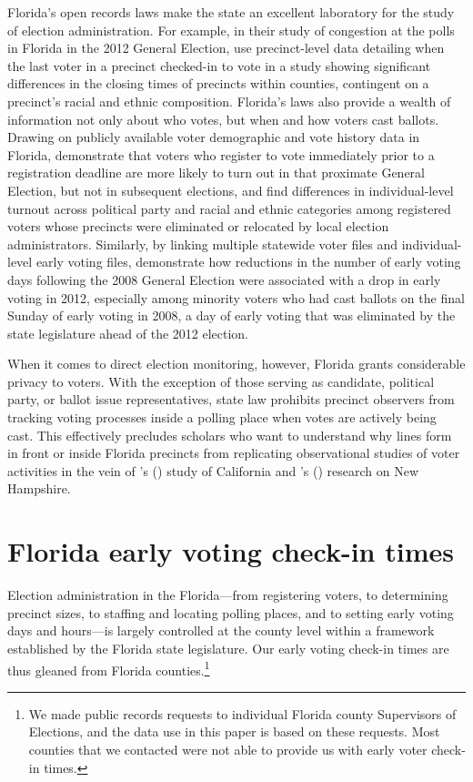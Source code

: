 \documentclass[12pt,titlepage]{article}
\newcommand{\possessivecite}[1]{\citeauthor{#1}'s (\citeyear{#1})}
\begin{document}
Florida's open records laws make the state an excellent laboratory for
the study of election administration. For example, in their study of
congestion at the polls in Florida in the 2012 General Election,
\cite{herronsmith:closingtimes} use precinct-level data detailing when
the last voter in a precinct checked-in to vote in a study showing
significant differences in the closing times of precincts within
counties, contingent on a precinct's racial and ethnic
composition. Florida's laws also provide a wealth of information not
only about who votes, but when and how voters cast ballots.  Drawing
on publicly available voter demographic and vote history data in
Florida, \cite{shinosmith:registrationtiming} demonstrate that voters
who register to vote immediately prior to a registration deadline are
more likely to turn out in that proximate General Election, but not in
subsequent elections, and \cite{amos_etal2017} find differences in
individual-level turnout across political party and racial and ethnic
categories among registered voters whose precincts were eliminated or
relocated by local election administrators.  Similarly, by linking
multiple statewide voter files and individual-level early voting
files, \cite{herron_smith2014} demonstrate how reductions in the
number of early voting days following the 2008 General Election were
associated with a drop in early voting in 2012, especially among
minority voters who had cast ballots on the final Sunday of early
voting in 2008, a day of early voting that was eliminated by the state
legislature ahead of the 2012 election.

When it comes to direct election monitoring, however, Florida grants
considerable privacy to voters.  With the exception of those serving
as candidate, political party, or ballot issue representatives, state
law prohibits precinct observers from tracking voting processes inside
a polling place when votes are actively being cast. This effectively
precludes scholars who want to understand why lines form in front or
inside Florida precincts from replicating observational studies of
voter activities in the vein of
\possessivecite{spencermarkovits:renege} study of California and
\possessivecite{herronsmith:hanoverstudy} research on New Hampshire.

\section*{Florida early voting check-in times}

Election administration in the Florida---from registering voters, to
determining precinct sizes, to staffing and locating polling places,
and to setting early voting days and hours---is largely controlled at
the county level within a framework established by the Florida state
legislature. Our early voting check-in times are thus gleaned from
Florida counties.\footnote{We made public records requests to
  individual Florida county Supervisors of Elections, and the data use
  in this paper is based on these requests.  Most counties that we
  contacted were not able to provide us with early voter check-in
  times.}
\end{document}

